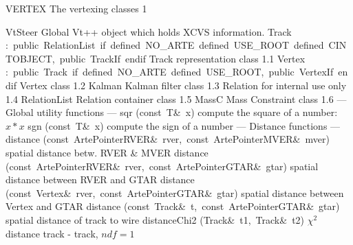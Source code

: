 \documentclass{article}
\begin{document}
\clearpage\pagebreak
\begin{cxxentry}
{}
        {VERTEX}
        {}
        {The vertexing classes}
        {1}
\begin{cxxnames}
        {VtSteer}
        {}
        { Global Vt++ object which holds XCVS information.}
        {}
\label{cxx.1.7}
        {Track}
        {:\ public\ RelationList\ if\ defined\ NO\_ARTE\ defined\ USE\_ROOT\ defined\ CINTOBJECT,\ public\ TrackIf\ endif}
        {Track representation class}
        {1.1}
        {Vertex}
        {:\ public\ Track\ if\ defined\ NO\_ARTE\ defined\ USE\_ROOT,\ public\ VertexIf\ endif}
        {Vertex class }
        {1.2}
        {Kalman}
        {}
        {Kalman filter class}
        {1.3}
        {Relation}
        {}
        {for internal use only}
        {1.4}
        {RelationList}
        {}
        {Relation container class }
        {1.5}
        {MassC}
        {}
        {Mass Constraint class }
        {1.6}
\cxxitem{}
        {--- Global utility functions --- }
        {}
        {}
        {}
\label{cxx.1.8}
        {sqr}
        {(const\ T\&\ x)}
        { compute the square of a number: $x*x$}
        {}
\label{cxx.1.9}
        {sgn}
        {(const\ T\&\ x)}
        { compute the sign of a number}
        {}
\label{cxx.1.10}
\cxxitem{}
        {--- Distance functions --- }
        {}
        {}
        {}
\label{cxx.1.11}
        {distance}
        {(const\ ArtePointer\<RVER\>\&\ rver,\ const\ ArtePointer\<MVER\>\&\ mver)}
        { spatial distance betw. RVER \& MVER}
        {}
\label{cxx.1.12}
        {distance}
        {(const\ ArtePointer\<RVER\>\&\ rver,\ const\ ArtePointer\<GTAR\>\&\ gtar)}
        { spatial distance between RVER and GTAR}
        {}
\label{cxx.1.13}
        {distance}
        {(const\ Vertex\&\ rver,\ const\ ArtePointer\<GTAR\>\&\ gtar)}
        { spatial distance between Vertex and GTAR}
        {}
\label{cxx.1.14}
        {distance}
        {(const\ Track\&\ t,\ const\ ArtePointer\<GTAR\>\&\ gtar)}
        { spatial distance of track to wire}
        {}
\label{cxx.1.15}
        {distanceChi2}
        {(Track\&\ t1,\ Track\&\ t2)}
        { $\chi^2$ distance track - track, $ndf = 1$}
        {}

\end{cxxnames}
\end{cxxentry}
\end{document}
